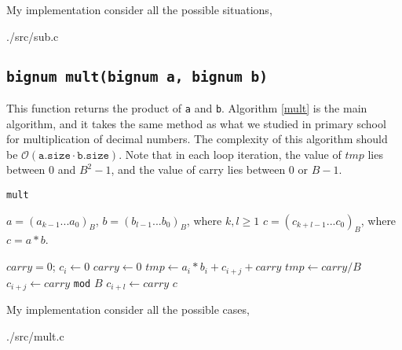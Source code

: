 My implementation consider all the possible situations,

{./src/sub.c}

\subsection{\texttt{bignum mult(bignum a, bignum b)}}
This function returns the product of \texttt{a} and \texttt{b}.
Algorithm \ref{mult} is the main algorithm, and it takes the same method as what
we studied in primary school for multiplication of decimal numbers. 
The complexity of this algorithm should be $\mathcal{O}(\texttt{a.size} \cdot
\texttt{b.size})$.
Note that in each loop iteration, the value of $tmp$ lies between $0$ and $B^2-1$,
and the value of carry lies between 0 or $B-1$.
\begin{algorithm} 
\caption{\texttt{mult}}
\label{mult}
  \begin{algorithmic}[1]
    \Require $a = (a_{k-1}...a_0)_B$, $b = (b_{l-1}...b_0)_B$, where $k, l \geq
    1$
    \Ensure $c = (c_{k+l-1}...c_0)_B$, where $c = a * b$.

    \State $carry = 0$;
      \State $c_i \gets 0$
    \EndFor
      \State $carry \gets 0$
        \State $tmp \gets a_i*b_i + c_{i+j} + carry$
        \State $tmp \gets carry / B$
        \State $c_{i+j} \gets carry$ \texttt{mod} $B$
      \EndFor
      \State $c_{i+l} \gets carry$
    \EndFor
    \State \Return $c$
  \end{algorithmic}
\end{algorithm}

My implementation consider all the possible cases,

{./src/mult.c}


